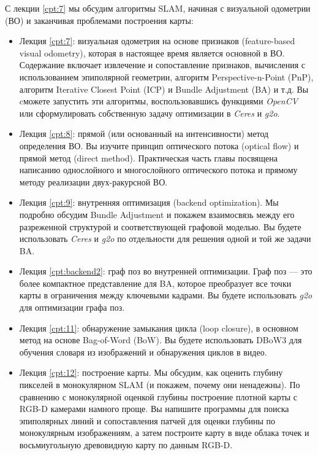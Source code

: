 \begin{Russian}
    С лекции \ref{cpt:7} мы обсудим алгоритмы SLAM, начиная с визуальной одометрии (ВО) и заканчивая проблемами построения карты: 
    \begin{itemize}
        \item Лекция \ref{cpt:7}: визуальная одометрия на основе признаков (feature-based visual odometry), которая в настоящее время является основной в ВО. Содержание включает извлечение и сопоставление признаков, вычисления с использованием эпиполярной геометрии, алгоритм Perspective-n-Point (PnP), алгоритм Iterative Closest Point (ICP) и Bundle Adjustment (BA) и т.д. Вы cможете запустить эти алгоритмы, воспользовавшись функциями \textit{OpenCV} или сформулировать собственную задачу оптимизации в \textit{Ceres} и \textit{g2o}.
        
        \item Лекция \ref{cpt:8}: прямой (или основанный на интенсивности) метод определения ВО. Вы изучите принцип оптического потока (optical flow) и прямой метод (direct method). Практическая часть главы посвящена написанию однослойного и многослойного оптического потока и прямому методу реализации двух-ракурсной ВО.
        
        \item Лекция \ref{cpt:9}: внутренняя оптимизация (backend optimization). Мы подробно обсудим Bundle Adjustment и покажем взаимосвязь между его разреженной структурой и соответствующей графовой моделью. Вы будете использовать \textit{Ceres} и \textit{g2o} по отдельности для решения одной и той же задачи BA.
        
        \item Лекция \ref{cpt:backend2}: граф поз во внутренней оптимизации. Граф поз --- это более компактное представление для BA, которое преобразует все точки карты в ограничения между ключевыми кадрами. Вы будете использовать \textit{g2o} для оптимизации графа поз.
        
        \item Лекция \ref{cpt:11}: обнаружение замыкания цикла (loop closure), в основном метод на основе Bag-of-Word (BoW). Вы будете использовать DBoW3 для обучения словаря из изображений и обнаружения циклов в видео.
        
        \item Лекция \ref{cpt:12}: построение карты. Мы обсудим, как оценить глубину пикселей в монокулярном SLAM (и покажем, почему они ненадежны). По сравнению с монокулярной оценкой глубины построение плотной карты с RGB-D камерами намного проще. Вы напишите программы для поиска эпиполярных линий и сопоставления патчей для оценки глубины по монокулярным изображениям, а затем построите карту в виде облака точек и восьмиугольную древовидную карту по данным RGB-D.
        

\end{itemize}
\end{Russian}
